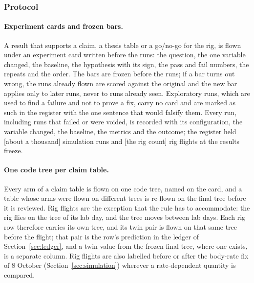 
\subsubsection{Protocol}
\label{sec:protocol}

\paragraph{Experiment cards and frozen bars.} A result that supports a claim, a thesis table or a go/no-go for the
rig, is flown under an experiment card written before the runs: the question, the one variable changed, the
baseline, the hypothesis with its sign, the pass and fail numbers, the repeats and the order. The bars are frozen
before the runs; if a bar turns out wrong, the runs already flown are scored against the original and the new bar
applies only to later runs, never to runs already seen. Exploratory runs, which are used to find a failure and not
to prove a fix, carry no card and are marked as such in the register with the one sentence that would falsify
them. Every run, including runs that failed or were voided, is recorded with its configuration, the variable
changed, the baseline, the metrics and the outcome; the register held [about a thousand] simulation runs and
[the rig count] rig flights at the results freeze.

\paragraph{One code tree per claim table.} Every arm of a claim table is flown on one code tree, named on the
card, and a table whose arms were flown on different trees is re-flown on the final tree before it is reviewed.
Rig flights are the exception that the rule has to accommodate: the rig flies on the tree of its lab day, and the
tree moves between lab days. Each rig row therefore carries its own tree, and its twin pair is flown on that same
tree before the flight; that pair is the row's prediction in the ledger of Section~\ref{sec:ledger}, and a twin
value from the frozen final tree, where one exists, is a separate column. Rig flights are also labelled before or
after the body-rate fix of 8 October (Section~\ref{sec:simulation}) wherever a rate-dependent quantity is
compared.

